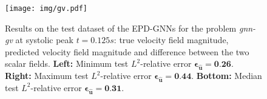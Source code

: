 
\begin{figure}[!htp]
  \centering
  \texttt{[image: img/gv.pdf]}
  \caption{Results on the test dataset of the EPD-GNNs for the problem \textit{gnn-gv} at systolic peak $t=0.125s$: true velocity field magnitude, predicted velocity field magnitude and difference between the two scalar fields. \textbf{Left: }Minimum test $L^2$-relative error $\boldsymbol{\epsilon}_{\widehat{\mathbf u}}=\textbf{0.26}$. \textbf{Right: } Maximum test $L^2$-relative error $\boldsymbol{\epsilon}_{\widehat{\mathbf u}}=\textbf{0.44}$. \textbf{Bottom: } Median test $L^2$-relative error $\boldsymbol{\epsilon}_{\widehat{\mathbf u}}=\textbf{0.31}$.}
  \label{fig:gv}
\end{figure}

